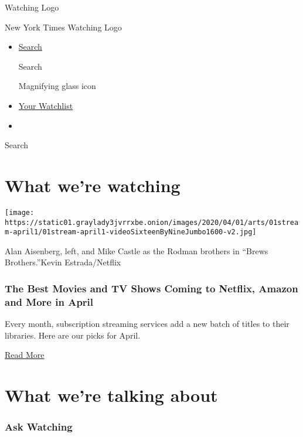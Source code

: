 \href{/watching}{}

Watching Logo

New York Times Watching Logo

\begin{itemize}
\item
  \href{/watching/search}{Search}

  Search

  Magnifying glass icon
\item
  \href{/watching/watchlist}{Your Watchlist}
\item
\end{itemize}

Search

\hypertarget{what-were-watching}{%
\section{What we're watching}\label{what-were-watching}}

\texttt{[image: https://static01.graylady3jvrrxbe.onion/images/2020/04/01/arts/01stream-april1/01stream-april1-videoSixteenByNineJumbo1600-v2.jpg]}

Alan Aisenberg, left, and Mike Castle as the Rodman brothers in ``Brews
Brothers.''Kevin Estrada/Netflix

\hypertarget{the-best-movies-and-tv-shows-coming-to-netflix-amazon-and-more-in-april}{%
\subsubsection{The Best Movies and TV Shows Coming to Netflix, Amazon
and More in
April}\label{the-best-movies-and-tv-shows-coming-to-netflix-amazon-and-more-in-april}}

Every month, subscription streaming services add a new batch of titles
to their libraries. Here are our picks for April.

\href{https://www.nytimes3xbfgragh.onion/2020/04/01/arts/television/new-to-stream-netflix.html}{Read
More}

\hypertarget{what-were-talking-about}{%
\section{What we're talking about}\label{what-were-talking-about}}

\hypertarget{ask-watching}{%
\subsubsection{Ask Watching}\label{ask-watching}}

